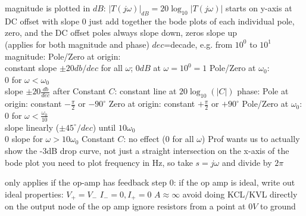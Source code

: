 \documentclass[12pt]{article}
\begin{document}
\begin{spacing}{0.8}
\begin{multicols*}{2}
\begin{flushleft}
\begin{outline}[longenum]
  \1 magnitude is plotted in $dB$: $|T(j\omega)|_{dB}=20\log_{10}|T(j\omega)|$
  \1 starts on y-axis at DC offset with slope 0
  \1 just add together the bode plots of each individual pole, zero, and the DC offset
  \1 poles always slope down, zeros slope up
    \\ (applies for both magnitude and phase)
  \1 $dec$=decade, e.g. from $10^0$ to $10^1$
  \1 magnitude:
    \2 Pole/Zero at origin:
      \\ constant slope $\pm20db/dec$ for all $\omega$; $0dB$ at $\omega=10^0=1$
    \2 Pole/Zero at $\omega_0$:
      \\ 0 for $\omega<\omega_0$
      \\ slope $\pm20\frac{db}{dec}$ after
    \2 Constant $C$: constant line at $20\log_{10}(|C|)$
  \1 phase:
    \2 Pole at origin: constant $-\frac{\pi}{2}$ or $-90^\circ$
    \2 Zero at origin: constant $+\frac{\pi}{2}$ or $+90^\circ$
    \2 Pole/Zero at $\omega_0$:
      \\ $0$ for $\omega<\frac{\omega_0}{10}$
      \\ slope linearly ($\pm45^\circ/dec$) until $10\omega_0$
      \\ $0$ slope for $\omega>10\omega_0$
    \2 Constant $C$: no effect ($0$ for all $\omega$)
  \1 Prof wants us to actually show the -3dB drop curve, not just a straight intersection
  \1 on the x-axis of the bode plot you need to plot frequency in Hz, so take $s=j\omega$ and divide by $2\pi$

  \1 only applies if the op-amp has feedback
  \1 step 0: if the op amp is ideal, write out ideal properties:
    \2 $V_+=V_-$
    \2 $I_-=0,I_+=0$
  \2 $A \approx \infty$
  \1 avoid doing KCL/KVL directly on the output node of the op amp
  \1 ignore resistors from a point at $0V$ to ground





\end{outline}
\end{flushleft}
\end{multicols*}
\end{spacing}
\end{document}
